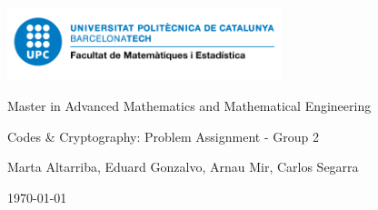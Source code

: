 \documentclass[a4paper, 10pt]{article}
\theoremstyle{definition} %
\begin{document}
\onehalfspacing
\pagestyle{empty}

\begin{center}
    \vspace{2cm}
    \includegraphics[width=8cm]{img/logo_fme.png}
    \vspace{2cm}

    \Large
    Master in Advanced Mathematics and Mathematical Engineering
    \vspace{0.5cm}

    \LARGE
    Codes \& Cryptography: Problem Assignment - Group 2

    \vspace{0.5cm}
    \large
    Marta Altarriba, Eduard Gonzalvo, Arnau Mir, Carlos Segarra

    \vspace{0.5cm}
    \normalsize
    \today

    \vspace{1cm}

\end{center}

\tableofcontents


\newpage
\pagestyle{fancy}

\newpage

\newpage

\newpage

\newpage

\end{document}
